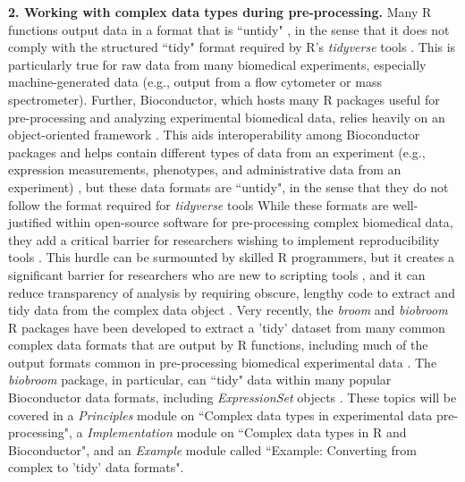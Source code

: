\documentclass[pdftex,english,11pt,parskip=half]{scrartcl}
\begin{document}
\textbf{2. Working with complex data types during pre-processing.} Many R functions output data in a format that is ``untidy" \cite{robinson2014broom}, in the sense that it does not comply with the structured ``tidy" format required by R's \textit{tidyverse} tools \cite{wickham2014tidy}. This is particularly true for raw data from many biomedical experiments, especially machine-generated data (e.g., output from a flow cytometer or mass spectrometer). Further, Bioconductor, which hosts many R packages useful for pre-processing and analyzing experimental biomedical data, relies heavily on an object-oriented framework \cite{gentleman2004bioconductor}.  This aids interoperability among Bioconductor packages and helps contain different types of data from an experiment (e.g., expression measurements, phenotypes, and administrative data from an experiment) \cite{gentleman2004bioconductor}, but these data formats are ``untidy", in the sense that they do not follow the format required for \textit{tidyverse} tools \cite{biobroom} While these formats are well-justified within open-source software for pre-processing complex biomedical data, they add a critical barrier for researchers wishing
to implement reproducibility tools \cite{robinson2014broom}. This hurdle can be surmounted by skilled R programmers, but it creates a significant barrier for researchers who are new to scripting tools \cite{robinson2014broom}, and it can reduce transparency of analysis by requiring obscure, lengthy code to extract and tidy data from the complex data object \cite{robinson2014broom}. Very recently, the \textit{broom} and \textit{biobroom} R packages have been developed 
to extract a 'tidy' dataset from many common complex data formats that are output by R functions, including much of the output formats common in pre-processing biomedical experimental data \cite{robinson2014broom, biobroom}.
The \textit{biobroom} package, in particular, can ``tidy" data within many popular Bioconductor data formats, including \textit{ExpressionSet} objects \cite{biobroom}. These topics will be covered in a \textit{Principles} module on ``Complex data types in
experimental data pre-processing", a \textit{Implementation} module on ``Complex
data types in R and Bioconductor", and an \textit{Example} module called
``Example: Converting from complex to 'tidy' data formats".
\end{document}
